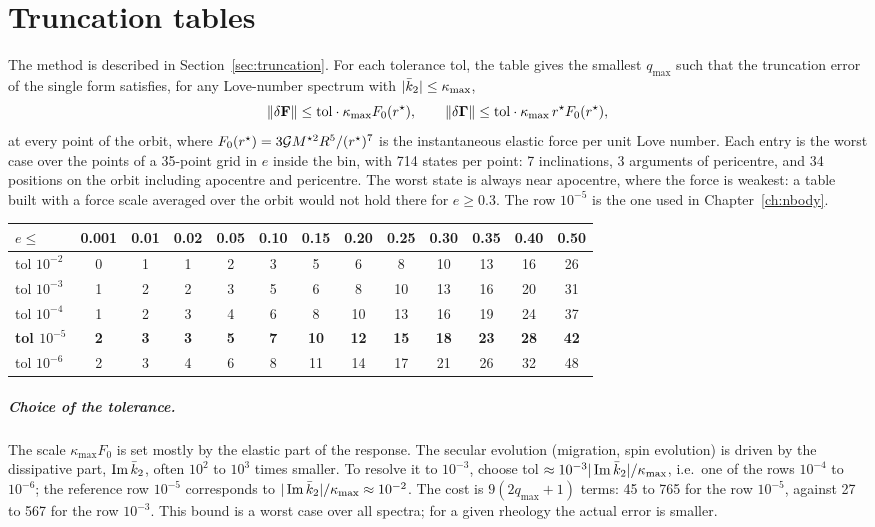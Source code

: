 \chapter{Truncation tables}\label{app:truncation}

The method is described in Section~\ref{sec:truncation}. For each tolerance tol, the table gives the smallest $q_{\max}$ such that the truncation error of the single form satisfies, for any Love-number spectrum with $|\bar k_2|\le\kappa_{\max}$,
\[
  \|\delta\mathbf F\|\le\mathrm{tol}\cdot\kappa_{\max}F_0(r^\star),\qquad \|\delta\boldsymbol\Gamma\|\le\mathrm{tol}\cdot\kappa_{\max}\,r^\star F_0(r^\star),
\]
at every point of the orbit, where $F_0(r^\star)=3\mathcal{G} M^{\star2}R^5/(r^\star)^7$ is the instantaneous elastic force per unit Love number. Each entry is the worst case over the points of a 35-point grid in $e$ inside the bin, with 714 states per point: 7 inclinations, 3 arguments of pericentre, and 34 positions on the orbit including apocentre and pericentre. The worst state is always near apocentre, where the force is weakest: a table built with a force scale averaged over the orbit would not hold there for $e\ge0.3$. The row $10^{-5}$ is the one used in Chapter~\ref{ch:nbody}.
\begin{center}
\renewcommand{\arraystretch}{1.2}\setlength{\tabcolsep}{4pt}\small
\begin{tabular}{l|cccccccccccc}\toprule
$e\le$ & 0.001 & 0.01 & 0.02 & 0.05 & 0.10 & 0.15 & 0.20 & 0.25 & 0.30 & 0.35 & 0.40 & 0.50\\\midrule
tol $10^{-2}$ & 0 & 1 & 1 & 2 & 3 & 5 & 6 & 8 & 10 & 13 & 16 & 26\\
tol $10^{-3}$ & 1 & 2 & 2 & 3 & 5 & 6 & 8 & 10 & 13 & 16 & 20 & 31\\
tol $10^{-4}$ & 1 & 2 & 3 & 4 & 6 & 8 & 10 & 13 & 16 & 19 & 24 & 37\\
\textbf{tol $10^{-5}$} & \textbf{2} & \textbf{3} & \textbf{3} & \textbf{5} & \textbf{7} & \textbf{10} & \textbf{12} & \textbf{15} & \textbf{18} & \textbf{23} & \textbf{28} & \textbf{42}\\
tol $10^{-6}$ & 2 & 3 & 4 & 6 & 8 & 11 & 14 & 17 & 21 & 26 & 32 & 48\\\bottomrule
\end{tabular}
\end{center}

\paragraph{Choice of the tolerance.} The scale $\kappa_{\max}F_0$ is set mostly by the elastic part of the response. The secular evolution (migration, spin evolution) is driven by the dissipative part, $\operatorname{Im}\bar k_2$, often $10^2$ to $10^3$ times smaller. To resolve it to $10^{-3}$, choose tol $\approx10^{-3}|\operatorname{Im}\bar k_2|/\kappa_{\max}$, i.e.\ one of the rows $10^{-4}$ to $10^{-6}$; the reference row $10^{-5}$ corresponds to $|\operatorname{Im}\bar k_2|/\kappa_{\max}\approx10^{-2}$. The cost is $9(2q_{\max}+1)$ terms: 45 to 765 for the row $10^{-5}$, against 27 to 567 for the row $10^{-3}$. This bound is a worst case over all spectra; for a given rheology the actual error is smaller.

